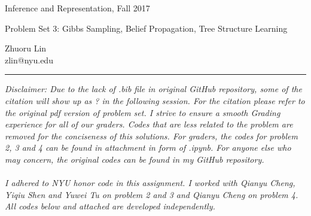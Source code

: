 \documentclass{article}
\newcommand{\ruleskip}{\bigskip\hrule\bigskip}
\begin{document}
\pagestyle{myheadings} 

{\LARGE
\begin{center}Inference and Representation, Fall 2017\end{center}
}

{\Large
Problem Set 3: Gibbs Sampling,  Belief Propagation, Tree Structure Learning
}
\begin{center}
Zhuoru Lin\\
zlin@nyu.edu
\end{center}


\ruleskip 
{\em Disclaimer: Due to the lack of .bib file in original GitHub repository, some of the citation will show up as ? in the following session. For the citation please refer to the original pdf version of problem set. I strive to ensure a smooth Grading experience for all of our graders. Codes that are less related to the problem are removed for the conciseness of this solutions. For graders, the codes for problem 2, 3 and 4 can be found in attachment in form of .ipynb. For anyone else who may concern, the original codes can be found in my GitHub repository. \\\\
I adhered to NYU honor code in this assignment. I worked with Qianyu Cheng, Yiqiu Shen and Yuwei Tu on problem 2 and 3 and Qianyu Cheng on problem 4. All codes below and attached are developed independently. 
}

\end{document}
